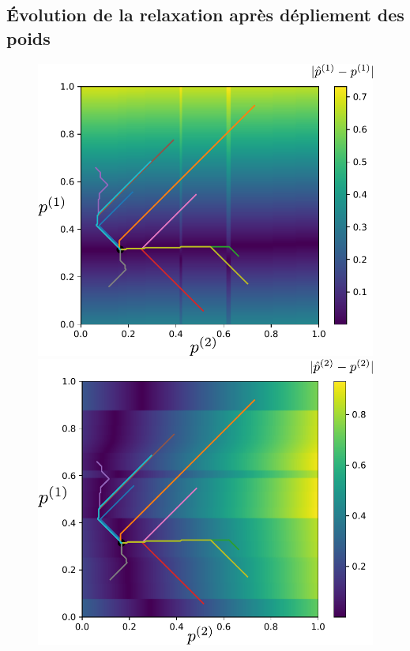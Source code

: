 \documentclass[../main]{subfiles}
\begin{document}
\subsection{\'Evolution de la relaxation après dépliement des poids}
\begin{figure}
	\begin{minipage}{0.5\textwidth}
	\centering
	\includegraphics[width=\textwidth]{champ_X_006.pdf}
	\end{minipage}
	\begin{minipage}{0.5\textwidth}
	\centering
	\includegraphics[width=\textwidth]{champ_Y_006.pdf}

\end{minipage}
\end{figure}
\end{document}
